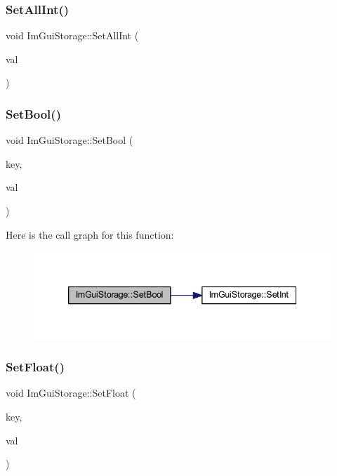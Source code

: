 \subsubsection{\texorpdfstring{Set\+All\+Int()}{SetAllInt()}}
{\footnotesize\ttfamily void Im\+Gui\+Storage\+::\+Set\+All\+Int (\begin{DoxyParamCaption}\item[{int}]{val }\end{DoxyParamCaption})}

\mbox{\label{struct_im_gui_storage_ac5beee31a59b3f5294b41992717be7bf}} 
\subsubsection{\texorpdfstring{Set\+Bool()}{SetBool()}}
{\footnotesize\ttfamily void Im\+Gui\+Storage\+::\+Set\+Bool (\begin{DoxyParamCaption}\item[{\mbox{\hyperlink{imgui_8h_a1785c9b6f4e16406764a85f32582236f}{Im\+Gui\+ID}}}]{key,  }\item[{bool}]{val }\end{DoxyParamCaption})}

Here is the call graph for this function\+:
\nopagebreak
\begin{figure}[H]
\begin{center}
\leavevmode
\includegraphics[width=339pt]{struct_im_gui_storage_ac5beee31a59b3f5294b41992717be7bf_cgraph}
\end{center}
\end{figure}
\mbox{\label{struct_im_gui_storage_ab531d90a0e5a1a2453e351c499149756}} 
\subsubsection{\texorpdfstring{Set\+Float()}{SetFloat()}}
{\footnotesize\ttfamily void Im\+Gui\+Storage\+::\+Set\+Float (\begin{DoxyParamCaption}\item[{\mbox{\hyperlink{imgui_8h_a1785c9b6f4e16406764a85f32582236f}{Im\+Gui\+ID}}}]{key,  }\item[{float}]{val }\end{DoxyParamCaption})}

